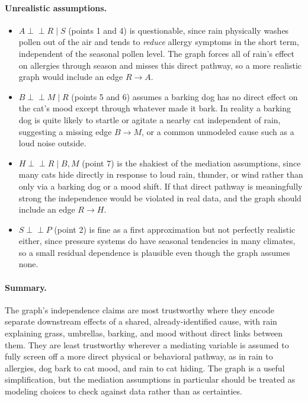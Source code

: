 \documentclass[11pt]{article}
\newcommand{\indep}{\perp\!\!\!\perp}
\begin{document}
\paragraph{Unrealistic assumptions.}
\begin{itemize}[leftmargin=*]
  \item $A \indep R \mid S$ (points 1 and 4) is questionable, since rain
  physically washes pollen out of the air and tends to \emph{reduce} allergy
  symptoms in the short term, independent of the seasonal pollen level. The
  graph forces all of rain's effect on allergies through season and misses this
  direct pathway, so a more realistic graph would include an edge $R \to A$.
  \item $B \indep M \mid R$ (points 5 and 6) assumes a barking dog has no direct
  effect on the cat's mood except through whatever made it bark. In reality a
  barking dog is quite likely to startle or agitate a nearby cat independent of
  rain, suggesting a missing edge $B \to M$, or a common unmodeled cause such as
  a loud noise outside.
  \item $H \indep R \mid B,M$ (point 7) is the shakiest of the mediation
  assumptions, since many cats hide directly in response to loud rain, thunder,
  or wind rather than only via a barking dog or a mood shift. If that direct
  pathway is meaningfully strong the independence would be violated in real
  data, and the graph should include an edge $R \to H$.
  \item $S \indep P$ (point 2) is fine as a first approximation but not
  perfectly realistic either, since pressure systems do have seasonal
  tendencies in many climates, so a small residual dependence is plausible even
  though the graph assumes none.
\end{itemize}

\paragraph{Summary.} The graph's independence claims are most trustworthy where
they encode separate downstream effects of a shared, already-identified cause,
with rain explaining grass, umbrellas, barking, and mood without direct links
between them. They are least trustworthy wherever a mediating variable is
assumed to fully screen off a more direct physical or behavioral pathway, as in
rain to allergies, dog bark to cat mood, and rain to cat hiding. The graph is a
useful simplification, but the mediation assumptions in particular should be
treated as modeling choices to check against data rather than as certainties.
\newpage
\end{document}

